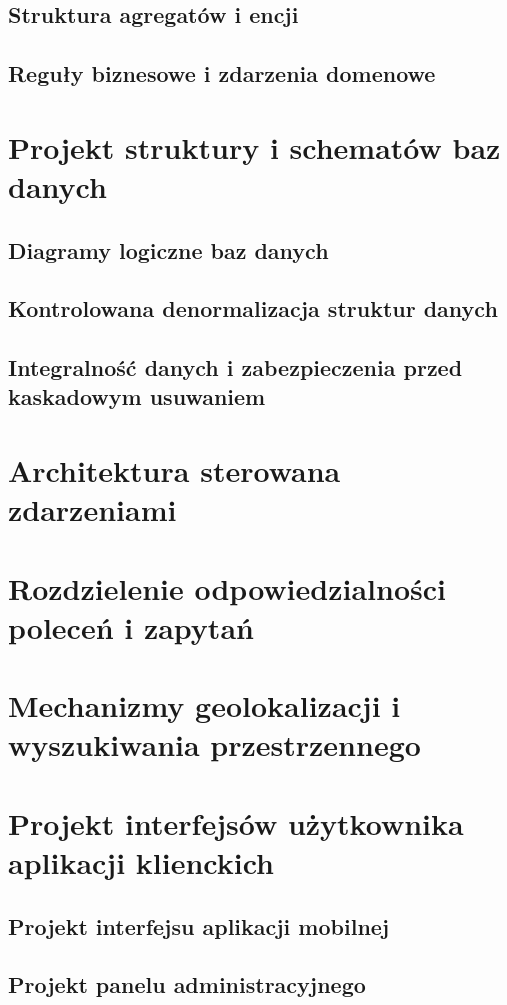 \subsection{Struktura agregatów i encji}
\sectionanchor

\subsection{Reguły biznesowe i zdarzenia domenowe}
\sectionanchor

\section{Projekt struktury i schematów baz danych}
\sectionanchor

\subsection{Diagramy logiczne baz danych}
\sectionanchor

\subsection{Kontrolowana denormalizacja struktur danych}
\sectionanchor

\subsection{Integralność danych i zabezpieczenia przed kaskadowym usuwaniem}
\sectionanchor

\section{Architektura sterowana zdarzeniami}
\sectionanchor

\section{Rozdzielenie odpowiedzialności poleceń i zapytań}
\sectionanchor

\section{Mechanizmy geolokalizacji i wyszukiwania przestrzennego}
\sectionanchor

\section{Projekt interfejsów użytkownika aplikacji klienckich}
\sectionanchor

\subsection{Projekt interfejsu aplikacji mobilnej}
\sectionanchor

\subsection{Projekt panelu administracyjnego}
\sectionanchor
